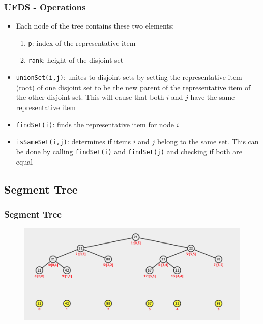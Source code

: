 \documentclass{beamer}
\begin{document}
\begin{frame}[fragile]
\frametitle{UFDS - Operations}
	\begin{itemize}
		\item Each node of the tree contains these two elements:
			\begin{enumerate}
			    \item \color{blue}\verb|p|\color{black}: index of the representative item			
			    \item \color{blue}\verb|rank|\color{black}: height of the disjoint set
			\end{enumerate}
	    \item \color{blue}\verb|unionSet(i,j)|\color{black}: unites to disjoint sets by setting the representative item (root) of one disjoint set to be the new parent of the representative item of the other disjoint set. This will cause that both $i$ and $j$ have the same representative item
	    \item \color{blue}\verb|findSet(i)|\color{black}: finds the representative item for node $i$
	    \item \color{blue}\verb|isSameSet(i,j)|\color{black}: determines if items $i$ and $j$ belong to the same set. This can be done by calling \verb|findSet(i)| and \verb|findSet(j)| and checking if both are equal
	\end{itemize}
\end{frame}


\subsection{Segment Tree}

\begin{frame}[fragile]
\frametitle{Segment Tree}
	\begin{figure}
	    \centering
	    \includegraphics[scale=0.3]{imgs/2.4/segment-tree/segment-tree.png}
	\end{figure}
\end{frame}
\end{document}

